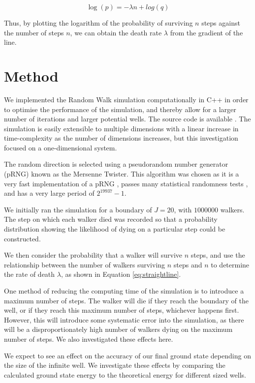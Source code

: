 \documentclass[journal]{IEEEtran}
\begin{document}
\begin{equation}
  \log(p) = -\lambda n + log(q)
  \label{eq:straightline}
\end{equation}

Thus, by plotting the logarithm of the probability of surviving $n$ steps
against the number of steps $n$, we can obtain the death rate $\lambda$ from the
gradient of the line.

\section{Method}
We implemented the Random Walk simulation computationally in
C++ in order to optimise the performance of the simulation, and thereby allow
for a larger number of iterations and larger potential wells. The source code is
available \cite{Pandian}. The simulation is easily extensible to multiple
dimensions with a linear increase in time-complexity as the number of dimensions
increases, but this investigation focused on a one-dimensional system.

The random direction is selected using a pseudorandom number generator (pRNG)
known as the Mersenne Twister. This algorithm was chosen as it is a very fast
implementation of a pRNG \cite{Route2017}, passes many statistical randomness
tests \cite{Bellamy2013}, and has a very large period of $2^{19937}-1$.

We initially ran the simulation for a boundary of $J = 20$, with $1000000$
walkers. The step on which each walker died was recorded so that a probability
distribution showing the likelihood of dying on a particular step could be
constructed.

We then consider the probability that a walker will survive $n$ steps, and use
the relationship between the number of walkers surviving $n$ steps and $n$ to
determine the rate of death $\lambda$, as shown in Equation \ref{eq:straightline}.

One method of reducing the computing time of the simulation is to introduce a
maximum number of steps. The walker will die if they reach the boundary of the
well, or if they reach this maximum number of steps, whichever happens
first. However, this will introduce some systematic error into the simulation,
as there will be a disproportionately high number of walkers dying on the
maximum number of steps. We also investigated these effects here.

We expect to see an effect on the accuracy of our final ground state depending
on the size of the infinite well. We investigate these effects by comparing the
calculated ground state energy to the theoretical energy for different sized wells.
\end{document}
